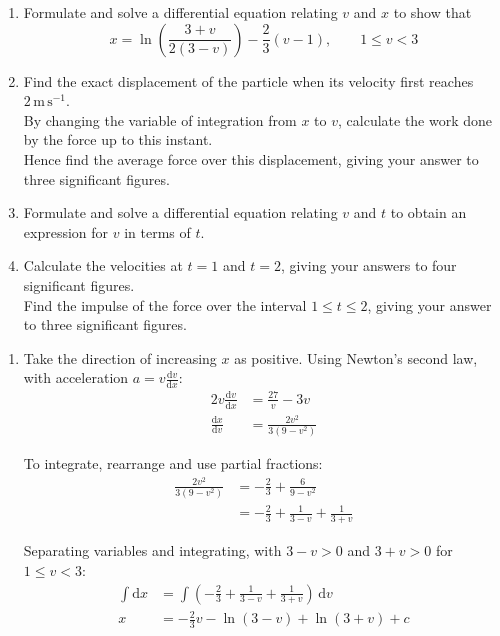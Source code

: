 \documentclass[leqno]{article}
\begin{document}
\begin{enumerate}[
  label=\textbf{\arabic*.},
  leftmargin=*,
  topsep=0pt,
  partopsep=0pt,
  parsep=0pt
]
\begin{enumerate}[label=\textbf{(\alph*)}]
  \item Formulate and solve a differential equation relating $v$ and $x$ to show that
  \[
  x=\ln\left(\frac{3+v}{2(3-v)}\right)-\frac{2}{3}(v-1),\qquad 1\leq v<3
  \] 
  \item Find the exact displacement of the particle when its velocity first reaches $2\,\mathrm{m\,s^{-1}}$. \\
  By changing the variable of integration from $x$ to $v$, calculate the work done by the force up to this instant. \\
  Hence find the average force over this displacement, giving your answer to three significant figures.  \\
  \item Formulate and solve a differential equation relating $v$ and $t$ to obtain an expression for $v$ in terms of $t$.  \\
  \item Calculate the velocities at $t=1$ and $t=2$, giving your answers to four significant figures. \\
  Find the impulse of the force over the interval $1\leq t\leq2$, giving your answer to three significant figures.  \\
\end{enumerate}

\vspace*{10pt}

\begin{djsSolution}
\begin{enumerate}[label=\textbf{(\alph*)}, start=1]
\item Take the direction of increasing \(x\) as positive. Using Newton's second law, with acceleration \(a=v\frac{\mathrm{d}v}{\mathrm{d}x}\):
\begin{align*}
2v\frac{\mathrm{d}v}{\mathrm{d}x}&=\frac{27}{v}-3v \\
\frac{\mathrm{d}x}{\mathrm{d}v}&=\frac{2v^2}{3(9-v^2)}
\end{align*}

To integrate, rearrange and use partial fractions:
\begin{align*}
\frac{2v^2}{3(9-v^2)}
&=-\frac23+\frac{6}{9-v^2} \\
&=-\frac23+\frac{1}{3-v}+\frac{1}{3+v}
\end{align*}

Separating variables and integrating, with \(3-v>0\) and \(3+v>0\) for \(1\leq v<3\):
\begin{align*}
\int \mathrm{d}x
&=\int\left(-\frac23+\frac{1}{3-v}+\frac{1}{3+v}\right)\,\mathrm{d}v \\
x&=-\frac23v-\ln(3-v)+\ln(3+v)+c
\end{align*}


\end{enumerate}
\end{djsSolution}
\end{enumerate}
\end{document}

